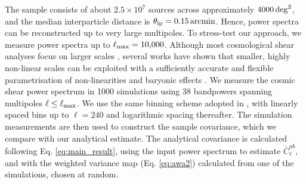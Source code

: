 \documentclass[%
 reprint,
superscriptaddress,
nofootinbib,
 amsmath,amssymb,
 aps,
 prd,
]{revtex4-2}
\begin{document}
    The sample consists of about $2.5\times10^7$ sources across approximately $4000\,{\rm deg}^2$, and the median interparticle distance is $\theta_{\rm ip}=0.15\,{\rm arcmin}$. Hence, power spectra can be reconstructed up to very large multipoles. To stress-test our approach, we measure power spectra up to $\ell_{\rm max}=10{,}000$. Although most cosmological shear analyses focus on larger scales \cite{2304.00701,2503.19441,2602.10065}, several works have shown that smaller, highly non-linear scales can be exploited with a sufficiently accurate and flexible parametrisation of non-linearities and baryonic effects \cite{2303.05537,2403.13794}. We measure the cosmic shear power spectrum in 1000 simulations using 38 bandpowers spanning multipoles $\ell\leq\ell_{\rm max}$. We use the same binning scheme adopted in \cite{2403.13794}, with linearly spaced bins up to $\ell=240$ and logarithmic spacing thereafter. The simulation measurements are then used to construct the sample covariance, which we compare with our analytical estimate. The analytical covariance is calculated following Eq. \ref{eq:main_result}, using the input power spectrum to estimate $\bar{C}^{ab}_\ell$, and with the weighted variance map (Eq. \ref{eq:awa2}) calculated from one of the simulations, chosen at random.
\end{document}

